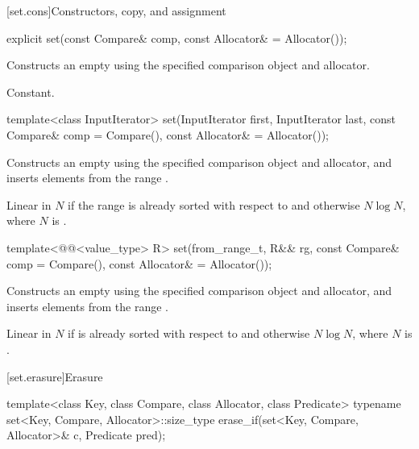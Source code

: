 %

[set.cons]{Constructors, copy, and assignment}

%
\begin{itemdecl}
explicit set(const Compare& comp, const Allocator& = Allocator());
\end{itemdecl}

\begin{itemdescr}
\pnum
\effects
Constructs an empty  using the specified comparison object and allocator.

\pnum
\complexity
Constant.
\end{itemdescr}

%
\begin{itemdecl}
template<class InputIterator>
  set(InputIterator first, InputIterator last,
      const Compare& comp = Compare(), const Allocator& = Allocator());
\end{itemdecl}

\begin{itemdescr}
\pnum
\effects
Constructs an empty
using the specified comparison object and allocator,
and inserts elements from the range
.

\pnum
\complexity
Linear in $N$ if the range
is already sorted with respect to 
and otherwise $N \log N$,
where $N$ is
.
\end{itemdescr}

%
\begin{itemdecl}
template<@@<value_type> R>
  set(from_range_t, R&& rg, const Compare& comp = Compare(), const Allocator& = Allocator());
\end{itemdecl}

\begin{itemdescr}
\pnum
\effects
Constructs an empty  using the specified comparison object and allocator,
and inserts elements from the range .

\pnum
\complexity
Linear in $N$ if  is already sorted with respect to  and
otherwise $N \log N$, where $N$ is .
\end{itemdescr}

[set.erasure]{Erasure}

%
\begin{itemdecl}
template<class Key, class Compare, class Allocator, class Predicate>
  typename set<Key, Compare, Allocator>::size_type
    erase_if(set<Key, Compare, Allocator>& c, Predicate pred);
\end{itemdecl}

